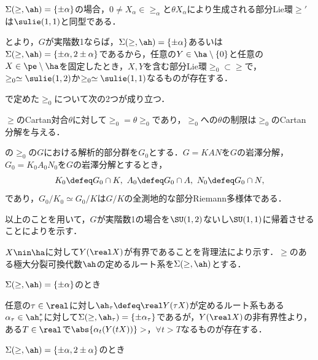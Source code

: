 \begin{lem}\label{lem:su11}
  
  $\Sigma(\ge,\ah) = \{\pm\alpha\}$の場合，$0\neq X_{\alpha}\in \ge_{\alpha}$と$\theta X_{\alpha}$により生成される部分Lie環$\ge'$は$\sulie(1,1)$と同型である．
\end{lem}

\begin{cor}\label{cor:sub-lie-alg}
  とより，$G$が実階数1ならば，$\Sigma(\ge,\ah) = \{\pm\alpha\} $あるいは$\Sigma(\ge,\ah)  = \{\pm\alpha, 2\pm\alpha \} $であるから，任意の$Y\in \ha\setminus\{0\} $と任意の$X\in \pe\setminus \ha$を固定したとき，$X,Y$を含む部分Lie環$\ge_0\subset \ge$で，$\ge_0\simeq \sulie(1,2) $か$\ge_0\simeq \sulie(1,1)$なるものが存在する．
\end{cor}

で定めた$\ge_0$について次の2つが成り立つ．
\begin{lem}\cite[p.~409, Lemma~2.2]{hel01}
  $\ge$のCartan対合$\theta$に対して$\ge_0 = \theta\ge_0$であり，$\ge_0 $への$\theta$の制限は$\ge_0$のCartan分解を与える．
\end{lem}


\begin{lem}\cite[p.~409, Lemma~2.3]{hel01}

  の$\ge_0$の$G$における解析的部分群を$G_0$とする．$G = KAN$を$G$の岩澤分解，$G_0 = K_0A_0N_0$を$G$の岩澤分解とするとき，
  \begin{align*}
    K_0\defeq G_0\cap K,\ A_0 \defeq G_0\cap A,\ N_0\defeq G_0\cap N, 
  \end{align*}
  であり，$G_0/K_0 \simeq G_0/K$は$G/K$の全測地的な部分Riemann多様体である．
  
\end{lem}

以上のことを用いて，$G$が実階数1の場合を$\SU(1,2) $ないし$\SU(1,1) $に帰着させることによりを示す．

\begin{pfwn}{}

  $X\nin \ha$に対して$Y(\real X)$が有界であることを背理法により示す．$\ge$のある極大分裂可換代数$\ah$の定めるルート系を$\Sigma(\ge,\ah) $とする．
  \begin{case}
    $\Sigma(\ge,\ah) = \{\pm\alpha \}$のとき

    任意の$\tau \in \real$に対し$\ah_{\tau} \defeq \real Y(\tau X)$が定めるルート系もある$\alpha_{\tau} \in \ah_{\tau}^{*} $に対して$\Sigma(\ge,\ah_{\tau}) = \{\pm\alpha_{\tau} \}$であるが，$Y(\real X) $の非有界性より，ある$T\in \real$で$\abs{\alpha_{t}(Y(tX))} >  $，$\forall t > T$なるものが存在する．
  \end{case}

  \begin{case}
    $\Sigma(\ge,\ah) = \{\pm\alpha,2\pm\alpha \}$のとき
    
    
  \end{case}
  
\end{pfwn}


